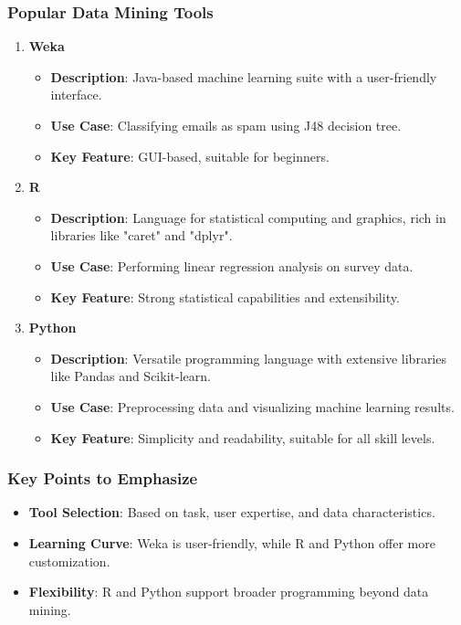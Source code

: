 \documentclass[aspectratio=169]{beamer}
\begin{document}
\begin{frame}[fragile]
    \frametitle{Popular Data Mining Tools}
    \begin{enumerate}
        \item \textbf{Weka}
            \begin{itemize}
                \item \textbf{Description}: Java-based machine learning suite with a user-friendly interface.
                \item \textbf{Use Case}: Classifying emails as spam using J48 decision tree.
                \item \textbf{Key Feature}: GUI-based, suitable for beginners.
            \end{itemize}
        \item \textbf{R}
            \begin{itemize}
                \item \textbf{Description}: Language for statistical computing and graphics, rich in libraries like "caret" and "dplyr".
                \item \textbf{Use Case}: Performing linear regression analysis on survey data.
                \item \textbf{Key Feature}: Strong statistical capabilities and extensibility.
            \end{itemize}
        \item \textbf{Python}
            \begin{itemize}
                \item \textbf{Description}: Versatile programming language with extensive libraries like Pandas and Scikit-learn.
                \item \textbf{Use Case}: Preprocessing data and visualizing machine learning results.
                \item \textbf{Key Feature}: Simplicity and readability, suitable for all skill levels.
            \end{itemize}
    \end{enumerate}
\end{frame}

\begin{frame}[fragile]
    \frametitle{Key Points to Emphasize}
    \begin{itemize}
        \item \textbf{Tool Selection}: Based on task, user expertise, and data characteristics.
        \item \textbf{Learning Curve}: Weka is user-friendly, while R and Python offer more customization.
        \item \textbf{Flexibility}: R and Python support broader programming beyond data mining.
    \end{itemize}
\end{frame}
\end{document}
